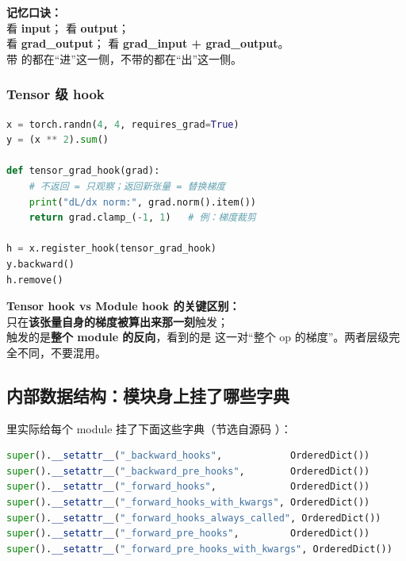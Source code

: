 \begin{intubox}
\textbf{记忆口诀：}\\
 看 \textbf{input}； 看 \textbf{output}；\\
 看 \textbf{grad\_output}； 看 \textbf{grad\_input + grad\_output}。\\
带  的都在“进”这一侧，不带的都在“出”这一侧。
\end{intubox}

\subsubsection{Tensor 级 hook}

\begin{lstlisting}[language=Python, caption=Tensor.register\_hook]
x = torch.randn(4, 4, requires_grad=True)
y = (x ** 2).sum()

def tensor_grad_hook(grad):
    # 不返回 = 只观察；返回新张量 = 替换梯度
    print("dL/dx norm:", grad.norm().item())
    return grad.clamp_(-1, 1)   # 例：梯度裁剪

h = x.register_hook(tensor_grad_hook)
y.backward()
h.remove()
\end{lstlisting}

\begin{warnbox}
\textbf{Tensor hook vs Module hook 的关键区别：}\\
 只在\textbf{该张量自身的梯度被算出来那一刻}触发；\\
 触发的是\textbf{整个 module 的反向}，看到的是  这一对“整个 op 的梯度”。两者层级完全不同，不要混用。
\end{warnbox}

\subsection{内部数据结构：模块身上挂了哪些字典}

 里实际给每个 module 挂了下面这些字典（节选自源码 ）：

\begin{lstlisting}[language=Python, caption=Module 初始化时挂载的 hook 字典]
super().__setattr__("_backward_hooks",            OrderedDict())
super().__setattr__("_backward_pre_hooks",        OrderedDict())
super().__setattr__("_forward_hooks",             OrderedDict())
super().__setattr__("_forward_hooks_with_kwargs", OrderedDict())
super().__setattr__("_forward_hooks_always_called", OrderedDict())
super().__setattr__("_forward_pre_hooks",         OrderedDict())
super().__setattr__("_forward_pre_hooks_with_kwargs", OrderedDict())
\end{lstlisting}

